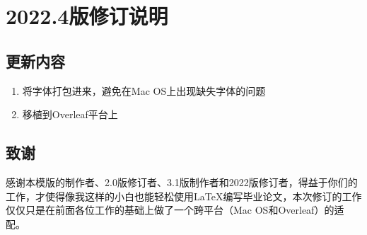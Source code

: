 \section{2022.4版修订说明}

\subsection{更新内容}

\begin{enumerate}[1、]
    \item 将字体打包进来，避免在Mac OS上出现缺失字体的问题
    \item 移植到Overleaf平台上
\end{enumerate}


\subsection{致谢}
感谢本模版的制作者、2.0版修订者、3.1版制作者和2022版修订者，得益于你们的工作，才使得像我这样的小白也能轻松使用\LaTeX 编写毕业论文，本次修订的工作仅仅只是在前面各位工作的基础上做了一个跨平台（Mac OS和Overleaf）的适配。